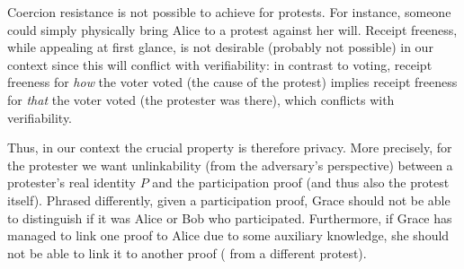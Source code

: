 Coercion resistance is not possible to achieve for protests.
For instance, someone could simply physically bring Alice to a protest against her will.
Receipt freeness, while appealing at first glance, is not desirable (probably 
not possible) in our context since this will conflict with verifiability: in 
contrast to voting, receipt freeness for \emph{how} the voter voted (\ie the 
cause of the protest) implies receipt freeness for \emph{that} the voter voted 
(\ie the protester was there), which conflicts with verifiability.

Thus, in our context the crucial property is therefore privacy.
More precisely, for the protester we want unlinkability (from the adversary's 
perspective) between a protester's real identity \(P\) and the participation 
proof (and thus also the protest itself).
Phrased differently, given a participation proof, Grace should not be able to 
distinguish if it was Alice or Bob who participated.
Furthermore, if Grace has managed to link one proof to Alice due to some 
auxiliary knowledge, she should not be able to link it to another proof (\eg 
from a different protest).




